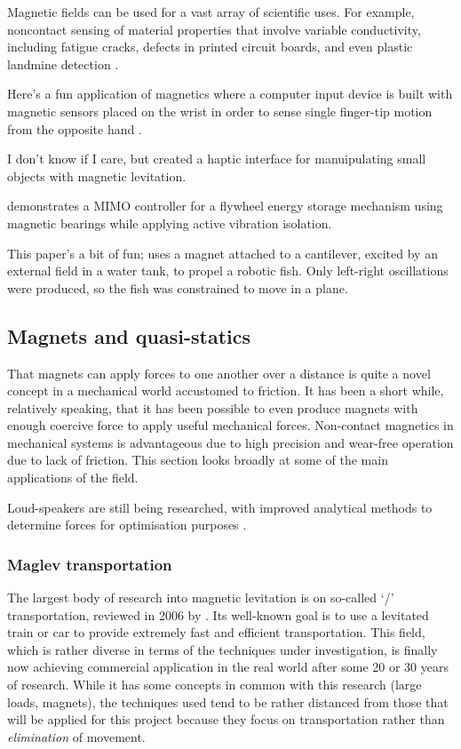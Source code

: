 Magnetic fields can be used for a vast array of scientific uses.
For example, noncontact sensing of material properties that involve variable conductivity, including fatigue cracks, defects in printed circuit boards, and even plastic landmine detection \cite{mukhopadhyay2005}.

Here's a fun application of magnetics where a computer input device is built with magnetic sensors placed on the wrist in order to sense single finger-tip motion from the opposite hand \parencite{han2008}.

I don't know if I care, but \textcite{vanwest2007} created a haptic interface for manuipulating small objects with magnetic levitation.

\textcite{park2008} demonstrates a MIMO controller for a flywheel energy storage mechanism using magnetic bearings while applying active vibration isolation.

\textcite{tomie2005} This paper's a bit of fun; uses a magnet attached to a cantilever, excited by an external field in a water tank, to propel a robotic fish.
Only left-right oscillations were produced, so the fish was constrained to move in a plane.

\subsection{Magnets and quasi-statics}

That magnets can apply forces to one another over a distance is quite a novel concept in a mechanical world accustomed to friction.
It has been a short while, relatively speaking, that it has been possible to even produce magnets with enough coercive force to apply useful mechanical forces.
Non-contact magnetics in mechanical systems is advantageous due to high precision and wear-free operation due to lack of friction.
This section looks broadly at some of the main applications of the field.

Loud-speakers are still being researched, with improved analytical methods to determine forces for optimisation purposes \cite{merit2009}.


\subsubsection{Maglev transportation}

The largest body of research into magnetic levitation is on so-called `\maglev/'
transportation, reviewed in 2006 by \textcite{lee2006}.
Its well-known goal is to use a levitated train or car to provide extremely fast and efficient transportation.
This field, which is rather diverse in terms of the techniques under investigation, is finally now achieving commercial application in the real world after some 20 or 30 years
of research.
While it has some concepts in common with this research (large loads, magnets), the techniques used tend to be rather distanced from those that will be applied for this project because they focus on transportation rather than \emph{elimination} of movement.

